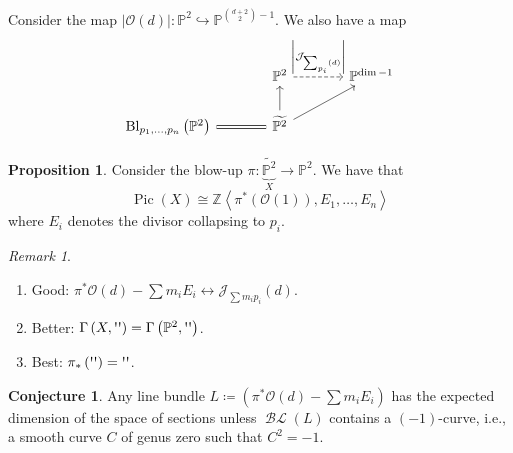 \documentclass[10pt,letterpaper,cm]{nupset}
\theoremstyle{definition}
\theoremstyle{theorem}
\newtheorem{prop}[defn]{Proposition}
\newtheorem{conj}[defn]{Conjecture}
\theoremstyle{remark}
\newtheorem{remark}[defn]{Remark}
\newcommand{\J}{\mathcal J}
\renewcommand{\O}{\mathcal O}
\renewcommand{\P}{\mathbb P}
\newcommand{\Z}{\mathbb Z}
\newcommand{\1}{\mathbb{1}}
\newcommand{\0}{\vec 0}
\DeclareMathOperator{\pic}{Pic}
\DeclareMathOperator{\BL}{\mathcal{BL}}
\DeclareMathOperator{\bl}{\mathrm{Bl}}
\newcommand{\be}{\begin{enumerate}}
\newcommand{\ee}{\end{enumerate}}
\begin{document}
Consider the map $\left\lvert{\O(d)}\right\rvert : \P^2 \hookrightarrow \P^{{{d+2}\choose 2} -1}$. We also have a map
\[
\begin{tikzcd}[column sep = large]
                                                    & \P^2 \arrow[r, "\left\lvert{\J_{\sum_{p_i}(d)}}\right\rvert", dashed] & \P^{\dim -1} \\
{\bl_{p_1, \ldots, p_n}\left(\P^2\right)} \arrow[r, equals] & \widetilde{\P^2} \arrow[u] \arrow[ru]                      &             
\end{tikzcd}
\]

\begin{prop}
Consider the blow-up $\pi : \underbrace{\widetilde{\P^2}}_{X} \to \P^2$. We have that $$\pic(X) \cong \Z\left\langle \pi^{\ast}\left(\O(1)\right), E_1, \ldots, E_n\right\rangle$$ where $E_i$ denotes the divisor collapsing to $p_i$.
\end{prop}

\begin{remark} $ $
\be
\item[Good:] $\pi^{\ast}{\O(d)} - \sum{m_iE_i} \longleftrightarrow \J_{\sum{m_ip_i}}(d)$.
\item[Better:] $\Gamma\left(X, \text{\textquotesingle\textquotesingle}\right) = \Gamma\left(\P^2, \text{\textquotesingle\textquotesingle}\right) $.
\item[Best:] $\pi_{\ast}\left( \text{\textquotesingle\textquotesingle}\right) =  \text{\textquotesingle\textquotesingle}$.
\ee
\end{remark}

\begin{conj}
Any line bundle $L \coloneqq \left(\pi^{\ast}{\O(d)} -\sum{m_iE_i}\right)$ has the expected dimension of the space of sections unless $\BL\left(L\right)$ contains a $\left({-1}\right)$-curve, i.e., a smooth curve $C$ of genus zero  such that $C^2 = {-1}$.
\end{conj}
\end{document}
